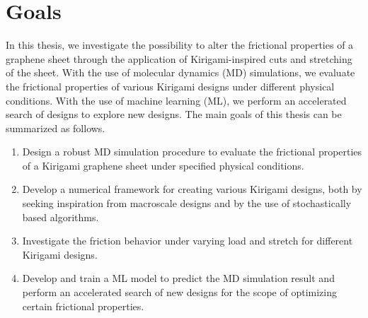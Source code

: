 \section{Goals} %
In this thesis, we investigate the possibility to alter the frictional
properties of a graphene sheet through the application of Kirigami-inspired cuts and stretching of the sheet. With the use of molecular dynamics (\acrshort{MD}) simulations, we evaluate the frictional properties of various Kirigami designs under different physical conditions. With the use of machine learning (\acrshort{ML}), we perform an accelerated search of designs to explore new designs. The main goals of this thesis can be summarized as follows.
\begin{enumerate} 
    \item Design a robust \acrshort{MD} simulation procedure to evaluate the frictional properties of a Kirigami graphene sheet under specified physical conditions.
    \item Develop a numerical framework for creating various Kirigami designs, both by seeking inspiration from macroscale designs and by the use of stochastically based algorithms.
    \item Investigate the friction behavior under varying load and stretch for different Kirigami designs.
    \item Develop and train a \acrshort{ML} model to predict the \acrshort{MD} simulation result and perform an accelerated search of new designs for the scope of optimizing certain frictional properties.
\end{enumerate}





